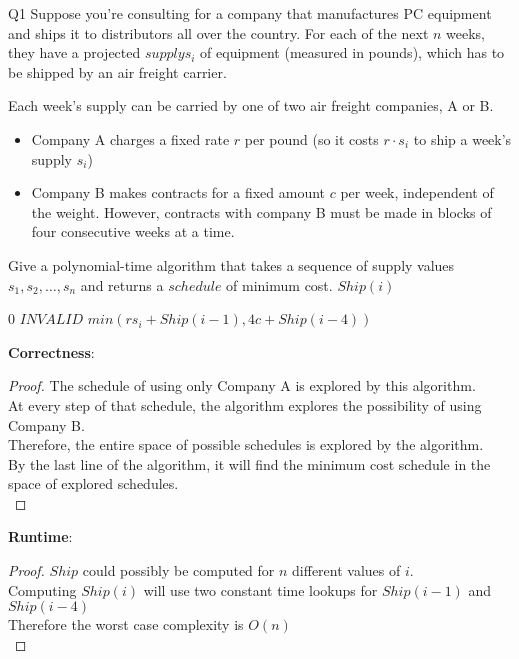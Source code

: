 \begin{problem}
  {Q1}
  Suppose you're consulting for a company that manufactures PC equipment and ships it to distributors all over the country.
  For each of the next $n$ weeks, they have a projected $supply s_i$ of equipment (measured in pounds), which has to be shipped
  by an air freight carrier.

  Each week's supply can be carried by one of two air freight companies, A or B.
  \begin{itemize}
    \item Company A charges a fixed rate $r$ per pound (so it costs $r \cdot s_i$ to ship a week's supply $s_i$)
    \item Company B makes contracts for a fixed amount $c$ per week, independent of the weight.
          However, contracts with company B must be made in blocks of four consecutive weeks at a time.
  \end{itemize}
  Give a polynomial-time algorithm that takes a sequence of supply values $s_1, s_2, \dots, s_n$ and returns a $schedule$ of minimum cost.
  $Ship(i)$
  \begin{algorithmic}[1]
      \RETURN $0$
      \ENDIF
      \RETURN $INVALID$
      \ENDIF
      \RETURN $min(rs_i + Ship(i-1), 4c + Ship(i-4))$
  \end{algorithmic}
  \noindent
  \textbf{Correctness}:
  \begin{proof}
    The schedule of using only Company A is explored by this algorithm. \\
    At every step of that schedule, the algorithm explores the possibility of using Company B. \\
    Therefore, the entire space of possible schedules is explored by the algorithm. \\
    By the last line of the algorithm, it will find the minimum cost schedule in the space of explored schedules. \\
  \end{proof}
  \textbf{Runtime}:
  \begin{proof}
      $Ship$ could possibly be computed for $n$ different values of $i$. \\
      Computing $Ship(i)$ will use two constant time lookups for $Ship(i-1)$ and $Ship(i-4)$ \\
      Therefore the worst case complexity is $O(n)$ \\
  \end{proof}
\end{problem}
